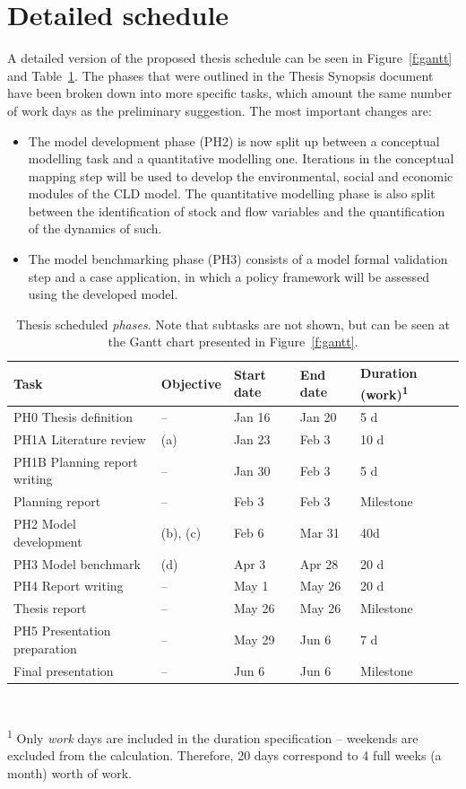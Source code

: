 \documentclass[a4paper,fontsize=11pt,bibliography=totoc]{scrartcl}
\newcommand{\fref}[1]{Figure~\ref{#1}}
\newcommand{\tref}[1]{Table~\ref{#1}}
\begin{document}
\section{Detailed schedule}
A detailed version of the proposed thesis schedule can be seen in \fref{f:gantt} and \tref{t:schedule}. The phases that were outlined in the Thesis Synopsis document have been broken down into more specific tasks, which amount the same number of work days as the preliminary suggestion. The most important changes are:
%
\begin{itemize}
\item The model development phase (PH2) is now split up between a conceptual modelling task and a quantitative modelling one. Iterations in the conceptual mapping step will be used to develop the environmental, social and economic modules of the CLD model. The quantitative modelling phase is also split between the identification of stock and flow variables and the quantification of the dynamics of such.
\item The model benchmarking phase (PH3) consists of a model formal validation step and a case application, in which a policy framework will be assessed using the developed model.
\end{itemize}

\begin{table}[h!]
\centering
\footnotesize
\caption{Thesis scheduled \textit{phases}. Note that subtasks are not shown, but can be seen at the Gantt chart presented in \fref{f:gantt}.}
\label{t:schedule}
\begin{tabular}{lllll}
\toprule
Task & Objective & Start date & End date & Duration (work)\textsuperscript{1} \\
\midrule
PH0 Thesis definition & -- & Jan 16 & Jan 20 & 5 d \\
PH1A Literature review & (a) & Jan 23 & Feb 3 & 10 d \\
PH1B Planning report writing & -- & Jan 30 & Feb 3 & 5 d \\
Planning report & -- & Feb 3 & Feb 3 & Milestone \\
PH2 Model development & (b), (c) & Feb 6 & Mar 31 & 40d \\
PH3 Model benchmark & (d) & Apr 3 & Apr 28 & 20 d \\
PH4 Report writing & -- & May 1 & May 26 & 20 d \\
Thesis report & -- & May 26 & May 26 & Milestone \\
PH5 Presentation preparation & -- & May 29 & Jun 6 & 7 d \\
Final presentation & -- & Jun 6 & Jun 6 & Milestone \\
\bottomrule
\end{tabular}
{\\ \scriptsize \parbox{0.7\linewidth}{\textsuperscript{1} Only \textit{work} days are included in the duration specification -- weekends are excluded from the calculation. Therefore, 20 days correspond to 4 full weeks (a month) worth of work.}}
\end{table}
\end{document}
